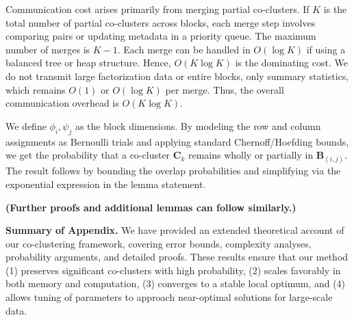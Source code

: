 \documentclass[journal]{IEEEtran}
\begin{document}
\begin{IEEEproof}
    Communication cost arises primarily from merging partial co-clusters. If $K$ is the total number of partial co-clusters across blocks, each merge step involves comparing pairs or updating metadata in a priority queue. The maximum number of merges is $K-1$. Each merge can be handled in $O(\log K)$ if using a balanced tree or heap structure. Hence, $O(K\log K)$ is the dominating cost. We do not transmit large factorization data or entire blocks, only summary statistics, which remains $O(1)$ or $O(\log K)$ per merge. Thus, the overall communication overhead is $O(K\log K)$.
\end{IEEEproof}

\begin{IEEEproof}
    We define $\phi_i,\psi_j$ as the block dimensions. By modeling the row and column assignments as Bernoulli trials and applying standard Chernoff/Hoefding bounds, we get the probability that a co-cluster $\mathbf{C}_k$ remains wholly or partially in $\mathbf{B}_{(i,j)}$. The result follows by bounding the overlap probabilities and simplifying via the exponential expression in the lemma statement.
\end{IEEEproof}

\noindent \textbf{(Further proofs and additional lemmas can follow similarly.)}

\vspace{1em}
\noindent
\textbf{Summary of Appendix.} We have provided an extended theoretical account of our co-clustering framework, covering error bounds, complexity analyses, probability arguments, and detailed proofs. These results ensure that our method (1) preserves significant co-clusters with high probability, (2) scales favorably in both memory and computation, (3) converges to a stable local optimum, and (4) allows tuning of parameters to approach near-optimal solutions for large-scale data.
\end{document}
